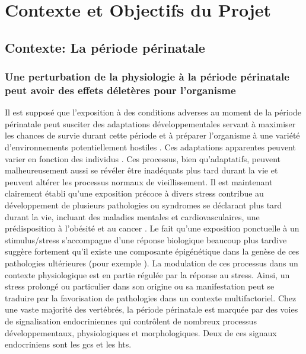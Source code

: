 \documentclass[../main.tex]{subfiles}
\begin{document}
\chapter{Contexte et Objectifs du Projet}




\section{Contexte: La période périnatale}


	\subsection{Une perturbation de la physiologie à la période périnatale peut avoir des effets déletères pour l'organisme}
		Il est supposé que l'exposition à des conditions adverses au moment de la période périnatale peut susciter des adaptations développementales servant à maximiser les chances de survie durant cette période et à préparer l'organisme à une variété d'environnements potentiellement hostiles \citep{Angelier2013,Crespi2013,Patterson2014}.
		Ces adaptations apparentes peuvent varier en fonction des individus \citep{Cockrem2013}.
		Ces processus, bien qu'adaptatifs, peuvent malheureusement aussi se révéler être inadéquats plus tard durant la vie et peuvent altérer les processus normaux de vieillissement.
		Il est maintenant clairement établi qu'une exposition précoce à divers stress contribue au développement de plusieurs pathologies ou syndromes se déclarant plus tard durant la vie, incluant des maladies mentales et cardiovasculaires, une prédisposition à l'obésité et au cancer \citep{Braun2013,Harris2011,Plagemann2006,Challis2000,Davis2013,Barnes2011}.
		Le fait qu'une exposition ponctuelle à un stimulus/stress s'accompagne d'une réponse biologique beaucoup plus tardive suggère fortement qu'il existe une composante épigénétique dans la genèse de ces pathologies ultérieures (pour exemple \citealp{Weaver2004,Begum2013,Crudo2012,Drake2012}).
		La modulation de ces processus dans un contexte physiologique est en partie régulée par la réponse au stress.
		Ainsi, un stress prolongé ou particulier dans son origine ou sa manifestation peut se traduire par la favorisation de pathologies dans un contexte multifactoriel.
		Chez une vaste majorité des vertébrés, la période périnatale est marquée par des voies de signalisation endocriniennes qui contrôlent de nombreux processus développementaux, physiologiques et morphologiques.
		Deux de ces signaux endocriniens sont les \glspl{gc} et les \glspl{ht}.
\end{document}
